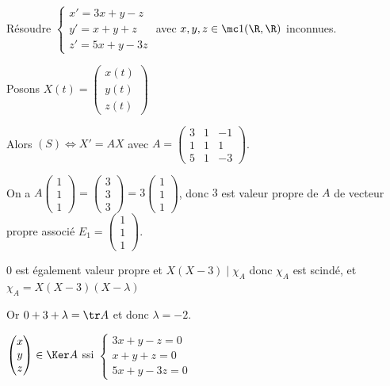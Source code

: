 \begin{exemple}
    Résoudre $\begin{cases}
        x' = 3x + y - z \\
        y' = x + y + z \\
        z' = 5x + y - 3z
    \end{cases}$ avec $x, y, z \in \mc 1 (\R, \R)$ inconnues. 

    Posons $X(t) = \begin{pmatrix}
    x(t) \\ y(t) \\ z(t)
    \end{pmatrix}$

    Alors $(S) \Leftrightarrow X' = AX$ avec $A = \begin{pmatrix}
    3 & 1 & -1 \\
    1 & 1 & 1 \\
    5 & 1 & -3
    \end{pmatrix}$.

    On a $A \begin{pmatrix}
    1 \\ 1 \\ 1
    \end{pmatrix} = \begin{pmatrix}
    3 \\ 3 \\ 3
    \end{pmatrix} = 3 \begin{pmatrix}
    1 \\ 1 \\ 1
    \end{pmatrix}$, donc $3$ est valeur propre de $A$ de vecteur propre associé $E_1 = \begin{pmatrix}
    1 \\ 1 \\ 1
    \end{pmatrix}$.

    $0$ est également valeur propre et $X (X - 3) \mid \chi_A$ donc 
    $\chi_A$ est scindé, et $\chi_A = X (X - 3)(X - \lambda)$

    Or $0 + 3 + \lambda = \tr A$ et donc $\lambda = -2$. 

    $\begin{pmatrix}
        x \\ y \\ z
    \end{pmatrix} \in \Ker A$ ssi $\begin{cases}
        3x + y - z = 0 \\
        x + y + z = 0 \\
        5x + y - 3z = 0
    \end{cases}$


\end{exemple}
